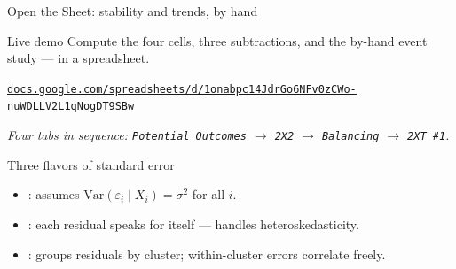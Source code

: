 \documentclass[aspectratio=169,11pt]{beamer}
\begin{document}

\begin{frame}{Open the Sheet: stability and trends, by hand}
\vspace{0.6em}
\begin{block}{Live demo}
Compute the four cells, three subtractions, and the by-hand event study --- in a spreadsheet.
\end{block}
\vspace{1em}
\begin{center}
\href{https://docs.google.com/spreadsheets/d/1onabpc14JdrGo6NFv0zCWo-nuWDLLV2L1qNogDT9SBw/edit?usp=sharing}{\color{ocean}\underline{\small\texttt{docs.google.com/spreadsheets/d/1onabpc14JdrGo6NFv0zCWo-nuWDLLV2L1qNogDT9SBw}}}
\end{center}
\vspace{1em}
\begin{center}
\small\color{warmgray}\itshape
Four tabs in sequence: \texttt{Potential Outcomes} $\rightarrow$ \texttt{2X2} $\rightarrow$ \texttt{Balancing} $\rightarrow$ \texttt{2XT \#1}.
\end{center}
\end{frame}


\begin{frame}{Three flavors of standard error}
\vspace{0.6em}
\begin{itemize}
  \item {}: assumes $\text{Var}(\varepsilon_i \mid X_i) = \sigma^2$ for all $i$.
  \item {}: each residual speaks for itself --- handles heteroskedasticity.
  \item {}: groups residuals by cluster; within-cluster errors correlate freely.
\end{itemize}
\vspace{0.6em}
\end{frame}
\end{document}
